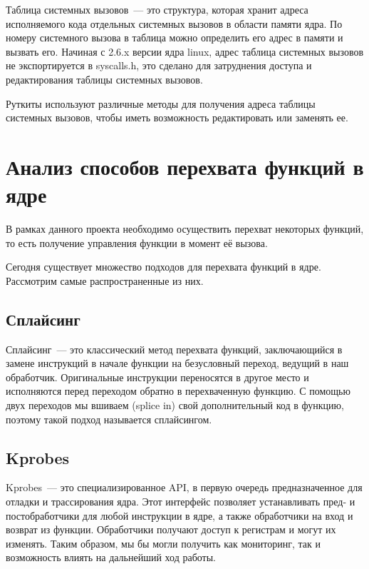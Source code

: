Таблица системных вызовов~--- это структура, которая хранит адреса исполняемого кода отдельных системных вызовов в области памяти ядра. По номеру системного вызова в таблица можно определить его адрес в памяти и вызвать его. Начиная с 2.6.x версии ядра linux, адрес таблица системных вызовов не экспортируется в syscalls.h, это сделано для затруднения доступа и редактирования таблицы системных вызовов.

Руткиты используют различные методы для получения адреса таблицы системных вызовов, чтобы иметь возможность редактировать или заменять ее.

\section{Анализ способов перехвата функций в ядре}%
\label{sec:analiz_sposobov_perekhvata_funktsii_v_iadre}

В рамках данного проекта необходимо осуществить перехват некоторых функций, то есть получение управления функции в момент её вызова.

Сегодня существует множество подходов для перехвата функций в ядре. Рассмотрим самые распространенные из них.

\subsection{Сплайсинг}%
\label{sub:splaising}

Сплайсинг~--- это классический метод перехвата функций, заключающийся в замене инструкций в начале функции на безусловный переход, ведущий в наш обработчик. Оригинальные инструкции переносятся в другое место и исполняются перед переходом обратно в перехваченную функцию. С помощью двух переходов мы вшиваем (splice in) свой дополнительный код в функцию, поэтому такой подход называется сплайсингом.

\subsection{Kprobes}%
\label{sub:kprobes}

Kprobes~--- это специализированное API, в первую очередь предназначенное для отладки и трассирования ядра. Этот интерфейс позволяет устанавливать пред- и постобработчики для любой инструкции в ядре, а также обработчики на вход и возврат из функции. Обработчики получают доступ к регистрам и могут их изменять. Таким образом, мы бы могли получить как мониторинг, так и возможность влиять на дальнейший ход работы.

